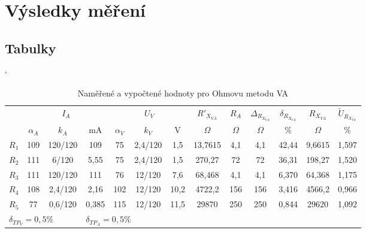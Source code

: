\documentclass[a4paper, czech]{article}
\begin{document}
\section{Výsledky měření}

\subsection{Tabulky}

\begin{table}[H]
    \catcode`
    \centering
    \caption{Naměřené a vypočtené hodnoty pro Ohmovu metodu VA}
    \begin{tabular}{lcccccccccccc}
        \toprule
        \multirow{2}{*}{} & \multicolumn{3}{c}{$I_A$} & \multicolumn{3}{c}{$U_V$} & $R'_{X_{VA}}$ & $R_A$ & $\Delta_{R_{X_{VA}}}$ & $\delta_{R_{X_{VA}}}$ & $R_{X_{VA}}$ & $\tilde{U}_{R_{X_{VA}}}$ \\
        \cmidrule(rl){2-4}
        \cmidrule(rl){5-7}
        \cmidrule(rl){8-8}
        \cmidrule(rl){9-9}
        \cmidrule(rl){10-10}
        \cmidrule(rl){11-11}
        \cmidrule(rl){12-12}
        \cmidrule(rl){13-13}
        & $\alpha_A$   & $k_A$       & mA     & $\alpha_V$    & $k_V$       & V     & $\Omega$         & $\Omega$    & $\Omega$               & \%              & $\Omega$        & \%          \\
        \midrule
        $R_1$                & 109  & 120/120  & 109    & 75    & 2,4/120  & 1,5   & 13,7615   & 4,1  & 4,1             & 42,44           & 9,6615   & 1,597       \\
        $R_2$                & 111  & 6/120    & 5,55   & 75    & 2,4/120  & 1,5   & 270,27    & 72   & 72              & 36,31           & 198,27   & 1,520       \\
        $R_3$                & 111  & 120/120  & 111    & 76    & 12/120   & 7,6   & 68,468    & 4,1  & 4,1             & 6,370           & 64,368   & 1,175       \\
        $R_4$                & 108  & 2,4/120  & 2,16   & 102   & 12/120   & 10,2  & 4722,2    & 156  & 156             & 3,416           & 4566,2   & 0,966       \\
        $R_5$                & 77   & 0,6/120  & 0,385  & 115   & 12/120   & 11,5  & 29870     & 250  & 250             & 0,844           & 29620    & 1,092      \\
        \bottomrule
        \multicolumn{3}{l}{$\delta_{TP_V} = 0,5\%$} & \multicolumn{3}{l}{$\delta_{TP_A} = 0,5\%$} 
    \end{tabular}
\end{table}
\end{document}
